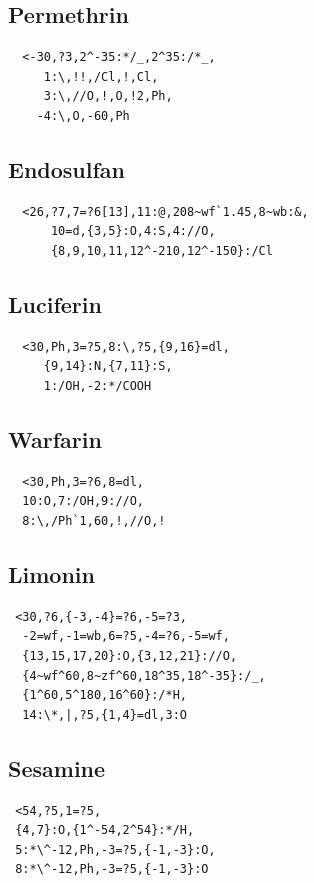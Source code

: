 \documentclass[a4paper]{article}
\makeatletter
\def\MCFstructure{\hspace{5mm}{\@strufont\char\fontnum}\advance\fontnum\@ne\relax}%
\makeatother
\begin{document}
\subsection{Permethrin}
\begin{verbatim}
  <-30,?3,2^-35:*/_,2^35:/*_,
     1:\,!!,/Cl,!,Cl,
     3:\,//O,!,O,!2,Ph,
    -4:\,O,-60,Ph
\end{verbatim}
\MCFstructure
\subsection{Endosulfan}
\begin{verbatim}
  <26,?7,7=?6[13],11:@,208~wf`1.45,8~wb:&,
      10=d,{3,5}:O,4:S,4://O,
      {8,9,10,11,12^-210,12^-150}:/Cl
\end{verbatim}
\MCFstructure
\subsection{Luciferin}
\begin{verbatim}
  <30,Ph,3=?5,8:\,?5,{9,16}=dl,
     {9,14}:N,{7,11}:S,
     1:/OH,-2:*/COOH
\end{verbatim}
\MCFstructure
\subsection{Warfarin}
\begin{verbatim}
  <30,Ph,3=?6,8=dl,
  10:O,7:/OH,9://O,
  8:\,/Ph`1,60,!,//O,!
\end{verbatim}
\MCFstructure
\subsection{Limonin}
\begin{verbatim}
 <30,?6,{-3,-4}=?6,-5=?3,
  -2=wf,-1=wb,6=?5,-4=?6,-5=wf,
  {13,15,17,20}:O,{3,12,21}://O,
  {4~wf^60,8~zf^60,18^35,18^-35}:/_,
  {1^60,5^180,16^60}:/*H,
  14:\*,|,?5,{1,4}=dl,3:O
\end{verbatim}
\MCFstructure
\subsection{Sesamine}
\begin{verbatim}
 <54,?5,1=?5,
 {4,7}:O,{1^-54,2^54}:*/H,
 5:*\^-12,Ph,-3=?5,{-1,-3}:O,
 8:*\^-12,Ph,-3=?5,{-1,-3}:O
\end{verbatim}
\MCFstructure
\end{document}
